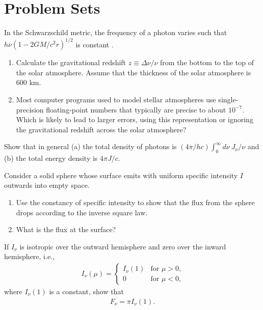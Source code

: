 
\chapter{Problem Sets}


\clearpage
\problemset

\begin{problem}
In the Schwarzschild metric, the frequency of a photon varies such that
$h\nu(1-2GM/c^2r)^{1/2}$ is constant \cite*[p.\ 187 and p.\ 659,
  although note that these authors set $G = c = 1$]{Misner-1973}.
\begin{enumerate}
\item[(a)]
Calculate the gravitational redshift $z \equiv \Delta\nu/\nu$ from the bottom to the top of the solar atmosphere. Assume that the thickness of the solar atmosphere is 600 km.
\item[(b)] Most computer programs used to model stellar atmospheres use
  single-precision floating-point numbers that typically are precise to
  about $10^{-7}$. Which is likely to lead to larger errors, using this
  representation or ignoring the gravitational redshift across the solar
  atmosphere?
\label{problem-gravitational-redshift}
\end{enumerate}
\end{problem}

\begin{problem}
\label{problem-photon-density}
\label{problem-energy-density}
Show that in general (a) the total density of photons is $(4\pi/h c)
\int_0^\infty\!d\nu\: J_\nu / \nu$ and (b) the total energy density is
$4\pi J / c$.
\end{problem}

\begin{problem}
Consider a solid sphere whose surface emits with uniform specific
intensity $I$ outwards into empty space. 
\begin{enumerate}
\item[(a)]
Use the constancy of specific
intensity to show that the flux from the sphere drops according to the
inverse square law. 
\item[(b)] What is the flux at the surface? 
\end{enumerate}

\end{problem}

\begin{problem}
\label{problem-flux-from-surface}
If $I_\nu$ is
isotropic over the outward hemisphere and zero over the
inward hemisphere, i.e.,
\begin{align}
I_\nu(\mu) =
\begin{cases}
I_\nu(1)&\mbox{for $\mu>0$,}\\
0&\mbox{for $\mu<0$,}
\end{cases}
\end{align}
where $I_\nu(1)$ is a constant, 
show that
\begin{align}
F_\nu = \pi I_\nu(1).
\end{align}
\end{problem}


